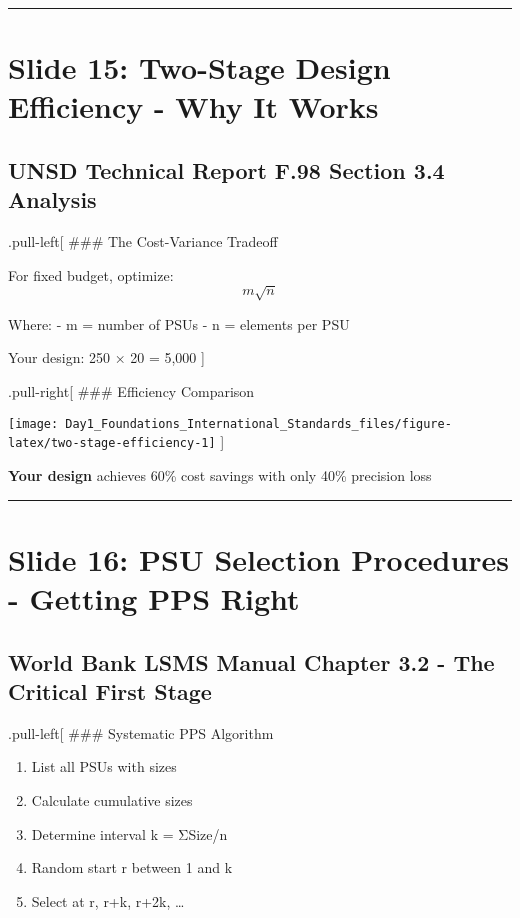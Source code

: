 \documentclass[
]{article}
\providecommand{\tightlist}{%
  \setlength{\itemsep}{0pt}\setlength{\parskip}{0pt}}
\begin{document}
\begin{center}\rule{0.5\linewidth}{0.5pt}\end{center}

\section{Slide 15: Two-Stage Design Efficiency - Why It
Works}\label{slide-15-two-stage-design-efficiency---why-it-works}

\subsection{UNSD Technical Report F.98 Section 3.4
Analysis}\label{unsd-technical-report-f.98-section-3.4-analysis}

.pull-left{[} \#\#\# The Cost-Variance Tradeoff

For fixed budget, optimize: \[m\sqrt{n}\]

Where: - m = number of PSUs - n = elements per PSU

Your design: 250 × 20 = 5,000 {]}

.pull-right{[} \#\#\# Efficiency Comparison

\texttt{[image: Day1\_Foundations\_International\_Standards\_files/figure-latex/two-stage-efficiency-1]}
{]}

\textbf{Your design} achieves 60\% cost savings with only 40\% precision
loss

\begin{center}\rule{0.5\linewidth}{0.5pt}\end{center}

\section{Slide 16: PSU Selection Procedures - Getting PPS
Right}\label{slide-16-psu-selection-procedures---getting-pps-right}

\subsection{World Bank LSMS Manual Chapter 3.2 - The Critical First
Stage}\label{world-bank-lsms-manual-chapter-3.2---the-critical-first-stage}

.pull-left{[} \#\#\# Systematic PPS Algorithm

\begin{enumerate}
\def\labelenumi{\arabic{enumi}.}
\tightlist
\item
  List all PSUs with sizes
\item
  Calculate cumulative sizes
\item
  Determine interval k = ΣSize/n
\item
  Random start r between 1 and k
\item
  Select at r, r+k, r+2k, \ldots{}
\end{enumerate}
\end{document}
